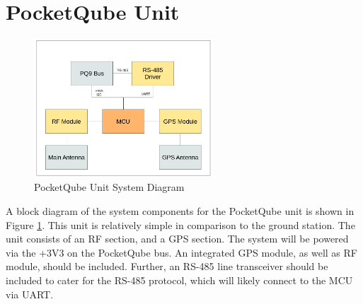 \graphicspath{{./figures}}

\section{PocketQube Unit}

\begin{figure}[!htb]
  \centering
  \includegraphics[width=0.6\textwidth]{pqunit_system}
  \caption{PocketQube Unit System Diagram}
  \label{fig:pqunit_system}
\end{figure}

A block diagram of the system components for the PocketQube unit is shown in Figure \ref{fig:pqunit_system}. This unit is relatively simple in comparison to the ground station. The unit consists of an RF section, and a GPS section. The system will be powered via the +3V3 on the PocketQube bus. An integrated GPS module, as well as RF module, should be included. Further, an RS-485 line transceiver should be included to cater for the RS-485 protocol, which will likely connect to the MCU via UART.